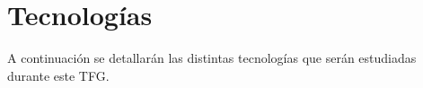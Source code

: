 \section{Tecnologías}
A continuación se detallarán las distintas tecnologías que serán estudiadas durante este TFG.


